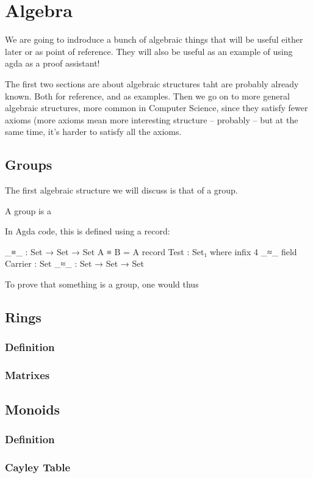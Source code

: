 \section{Algebra}
We are going to indroduce a bunch of algebraic things that will be useful either later or as point of reference. They will also be useful as an example of using agda as a proof assistant!

The first two sections are about algebraic structures taht are probably already known. Both for reference, and as examples. Then we go on to more general algebraic structures, more common in Computer Science, since they satisfy fewer axioms (more axioms mean more interesting structure -- probably -- but at the same time, it's harder to satisfy all the axioms.
\subsection{Groups}
The first algebraic structure we will discuss is that of a group.
\begin{Def}
A group is a 
\end{Def}

In Agda code, this is defined using a record:
\begin{code}
_≡_ : Set → Set → Set
A ≡ B = A
record Test : Set₁ where
  infix  4 _≈_
  field
    Carrier : Set
    _≈_     : Set → Set → Set
\end{code}
To prove that something is a group, one would thus
\subsection{Rings}
\subsubsection{Definition}
\subsubsection{Matrixes}
\subsection{Monoids}
\subsubsection{Definition}
\subsubsection{Cayley Table}
